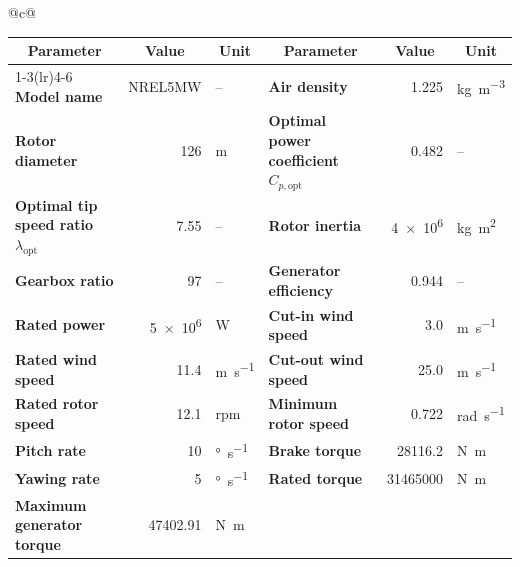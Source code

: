 \documentclass[border=8pt]{standalone}
\newcommand{\tableheader}[1]{\multicolumn{1}{c}{\cellcolor{headergray}\textbf{#1}}}
\newcommand{\param}[1]{\textbf{#1}}
\begin{document}
\pagecolor{white}
\begin{tabular}{@{}c@{}}
\renewcommand{\arraystretch}{1.12}
\setlength{\tabcolsep}{5pt}
\begin{tabular}{
  l
  r
  l
  @{\hspace{2em}}
  l
  r
  l
}
\toprule
\tableheader{Parameter} & \tableheader{Value} & \tableheader{Unit} &
\tableheader{Parameter} & \tableheader{Value} & \tableheader{Unit} \\
\cmidrule(lr){1-3}\cmidrule(lr){4-6}
\param{Model name} & \multicolumn{1}{l}{NREL5MW} & -- &
\param{Air density} & 1.225 & \si{\kilogram\per\cubic\metre} \\
\param{Rotor diameter} & 126 & \si{\metre} &
\param{Optimal power coefficient $C_{p,\mathrm{opt}}$} & 0.482 & -- \\
\param{Optimal tip speed ratio $\lambda_{\mathrm{opt}}$} & 7.55 & -- &
\param{Rotor inertia} & \num{4e6} & \si{\kilogram\metre\squared} \\
\param{Gearbox ratio} & 97 & -- &
\param{Generator efficiency} & 0.944 & -- \\
\param{Rated power} & \num{5e6} & \si{\watt} &
\param{Cut-in wind speed} & 3.0 & \si{\metre\per\second} \\
\param{Rated wind speed} & 11.4 & \si{\metre\per\second} &
\param{Cut-out wind speed} & 25.0 & \si{\metre\per\second} \\
\param{Rated rotor speed} & 12.1 & rpm &
\param{Minimum rotor speed} & 0.722 & \si{\radian\per\second} \\
\param{Pitch rate} & 10 & \si{\degree\per\second} &
\param{Brake torque} & \num{28116.2} & \si{\newton\metre} \\
\param{Yawing rate} & 5 & \si{\degree\per\second} &
\param{Rated torque} & \num{31465000} & \si{\newton\metre} \\
\param{Maximum generator torque} & \num{47402.91} & \si{\newton\metre} &
 & & \\
\bottomrule
\end{tabular}
\end{tabular}
\end{document}
